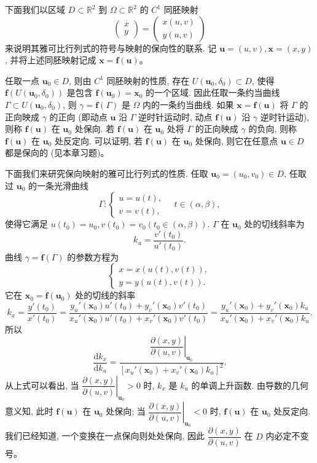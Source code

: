 \documentclass[UTF8, 12pt, fontset=fandol, oneside]{ctexart}
\begin{document}
下面我们以区域 $D\subset\mathbb R^2$ 到 $\Omega\subset\mathbb R^2$ 的 $C^1$ 同胚映射
\[
  \begin{pmatrix}x\\y\end{pmatrix}
  =
  \begin{pmatrix}x(u,v)\\y(u,v)\end{pmatrix}
\]
来说明其雅可比行列式的符号与映射的保向性的联系. 记 $\boldsymbol u=(u,v),\boldsymbol x=(x,y)$, 并将上述同胚映射记成 $\boldsymbol x=\boldsymbol f(\boldsymbol u)$。

任取一点 $\boldsymbol u_0\in D$, 则由 $C^1$ 同胚映射的性质, 存在 $U(\boldsymbol u_0,\delta_0)\subset D$, 使得 $\boldsymbol f(U(\boldsymbol u_0,\delta_0))$ 是包含 $\boldsymbol f(\boldsymbol u_0)=\boldsymbol x_0$ 的一个区域. 因此任取一条约当曲线 $\Gamma\subset U(\boldsymbol u_0,\delta_0)$, 则 $\gamma=\boldsymbol f(\Gamma)$ 是 $\Omega$ 内的一条约当曲线. 如果 $\boldsymbol x=\boldsymbol f(\boldsymbol u)$ 将 $\Gamma$ 的正向映成 $\gamma$ 的正向 (即动点 $\boldsymbol u$ 沿 $\Gamma$ 逆时针运动时, 动点 $\boldsymbol f(\boldsymbol u)$ 沿 $\gamma$ 逆时针运动), 则称 $\boldsymbol f(\boldsymbol u)$ 在 $\boldsymbol u_0$ 处保向. 若 $\boldsymbol f(\boldsymbol u)$ 在 $\boldsymbol u_0$ 处将 $\Gamma$ 的正向映成 $\gamma$ 的负向, 则称 $\boldsymbol f(\boldsymbol u)$ 在 $\boldsymbol u_0$ 处反定向. 可以证明, 若 $\boldsymbol f(\boldsymbol u)$ 在 $\boldsymbol u_0$ 处保向, 则它在任意点 $\boldsymbol u\in D$ 都是保向的 (见本章习题)。

下面我们来研究保向映射的雅可比行列式的性质. 任取 $\boldsymbol u_0=(u_0,v_0)\in D$, 任取过 $\boldsymbol u_0$ 的一条光滑曲线
\[
  \Gamma:\begin{cases}
    u=u(t),\\
    v=v(t),
  \end{cases}\quad t\in(\alpha,\beta),
\]
使得它满足 $u(t_0)=u_0,v(t_0)=v_0(t_0\in(\alpha,\beta))$. $\Gamma$ 在 $\boldsymbol u_0$ 处的切线斜率为
\[
  k_u=\frac{v'(t_0)}{u'(t_0)}.
\]
曲线 $\gamma=\boldsymbol f(\Gamma)$ 的参数方程为
\[
  \begin{cases}
    x=x(u(t),v(t)),\\
    y=y(u(t),v(t)).
  \end{cases}
\]
它在 $\boldsymbol x_0=\boldsymbol f(\boldsymbol u_0)$ 处的切线的斜率
\[
  k_x=\frac{y'(t_0)}{x'(t_0)}
  =\frac{y_u'(\boldsymbol x_0)u'(t_0)+y_v'(\boldsymbol x_0)v'(t_0)}
  {x_u'(\boldsymbol x_0)u'(t_0)+x_v'(\boldsymbol x_0)v'(t_0)}
  =\frac{y_u'(\boldsymbol x_0)+y_v'(\boldsymbol x_0)k_u}
  {x_u'(\boldsymbol x_0)+x_v'(\boldsymbol x_0)k_u}.
\]
所以
\[
  \frac{\mathrm dk_x}{\mathrm dk_u}
  =
  \frac{\left.\dfrac{\partial(x,y)}{\partial(u,v)}\right|_{\boldsymbol u_0}}
  {[x_u'(\boldsymbol x_0)+x_v'(\boldsymbol x_0)k_u]^2}.
\]
从上式可以看出, 当 $\left.\dfrac{\partial(x,y)}{\partial(u,v)}\right|_{\boldsymbol u_0}>0$ 时, $k_x$ 是 $k_u$ 的单调上升函数. 由导数的几何意义知, 此时 $\boldsymbol f(\boldsymbol u)$ 在 $\boldsymbol u_0$ 处保向; 当 $\left.\dfrac{\partial(x,y)}{\partial(u,v)}\right|_{\boldsymbol u_0}<0$ 时, $\boldsymbol f(\boldsymbol u)$ 在 $\boldsymbol u_0$ 处反定向. 我们已经知道, 一个变换在一点保向则处处保向, 因此 $\dfrac{\partial(x,y)}{\partial(u,v)}$ 在 $D$ 内必定不变号。
\end{document}
